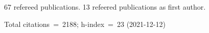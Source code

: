 67 refereed publications. 13 refeered publications as first author.

Total citations~=~2188; h-index~=~23 (2021-12-12)